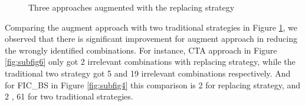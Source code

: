 \documentclass{sig-alternate}
\begin{document}
\begin{figure}[ht]
\centering
{}
\caption[Optional caption for list of figures]{Three approaches augmented with the replacing strategy}
\label{fig:subfigureExample2}
\end{figure}


Comparing the augment approach with two traditional strategies in Figure \ref{fig:subfigureExample2}, we observed that there is significant improvement for augment approach in reducing the wrongly identified combinations. For instance, CTA approach in Figure \ref{fig:subfig6} only got 2 irrelevant combinations with replacing strategy, while the traditional two strategy got 5 and 19 irrelevant combinations respectively. And for FIC\_BS in Figure \ref{fig:subfig4} this comparison is 2 for replacing strategy, and 2 , 61 for two traditional strategies.
\end{document}
